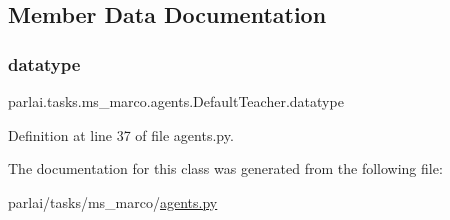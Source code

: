 \subsection{Member Data Documentation}
\mbox{\label{classparlai_1_1tasks_1_1ms__marco_1_1agents_1_1DefaultTeacher_abcedf76bc126510edfe336ab60b76a58}} 
\subsubsection{\texorpdfstring{datatype}{datatype}}
{\footnotesize\ttfamily parlai.\+tasks.\+ms\+\_\+marco.\+agents.\+Default\+Teacher.\+datatype}



Definition at line 37 of file agents.\+py.



The documentation for this class was generated from the following file\+:\begin{DoxyCompactItemize}
\item 
parlai/tasks/ms\+\_\+marco/\hyperlink{parlai_2tasks_2ms__marco_2agents_8py}{agents.\+py}\end{DoxyCompactItemize}
